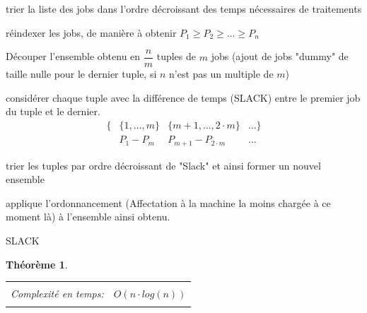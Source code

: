 \documentclass[a4paper,12pt]{report}
\theoremstyle{plain}				%
\newtheorem{theoreme}{Théorème}	%
\theoremstyle{definition}				%
\begin{document}
\bigskip
\begin{algorithm}[H]
\DontPrintSemicolon

trier la liste des jobs dans l'ordre décroissant des temps nécessaires de traitements

\BlankLine %
réindexer les jobs, de manière à obtenir $P_1 \geq P_2 \geq ... \geq P_n$

\BlankLine %
Découper l'ensemble obtenu en $\dfrac{n}{m}$ tuples de $m$ jobs (ajout
de jobs "dummy" de taille nulle pour le dernier tuple, si $n$ n'est
pas un multiple de $m$)

\BlankLine %
considérer chaque tuple avec la différence de temps (SLACK) entre le
premier job du tuple et le dernier.
\begin{align*}
\{ &\{1, ..., m\} &\{m+1,..., 2 \cdot m\} &... \} \\
   &P_1 - P_m     &P_{m+1}-P_{2 \cdot m}  &...
\end{align*}


\BlankLine %
trier les tuples par ordre décroissant de "Slack" et ainsi former un nouvel ensemble

\BlankLine %
applique l'ordonnancement (Affectation à la machine la moins chargée à ce moment là) à l'ensemble ainsi obtenu.

\caption{SLACK\label{algo:SLACK}}
\end{algorithm}

\bigskip
\begin{theoreme}
\begin{flushleft}
\begin{tabular}{|p{8cm}p{6cm}|}
\hline
& \\
Complexité en temps:& $O(n \cdot log (n))$
\\
& \\
\hline
\end{tabular}
\end{flushleft}
\end{theoreme}
\end{document}
